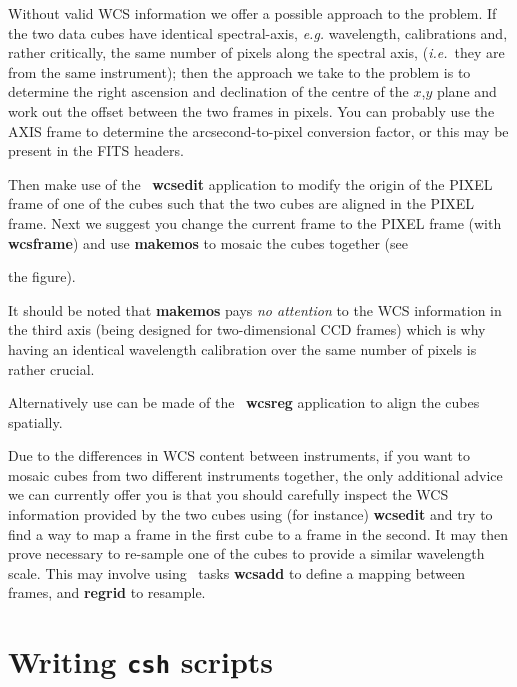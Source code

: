 \documentclass[twoside,11pt]{article}
\newcommand{\xref}[3]{#1}
\newcommand{\xlabel}[1]{}
\begin{document}
{Without valid WCS information we offer a possible approach to the
problem.  If the two data cubes have identical spectral-axis,
\emph{e.g.} wavelength, calibrations and, rather critically, the same
number of pixels along the spectral axis, (\emph{i.e.}\ they are from
the same instrument); then the approach we take to the problem is to
determine the right ascension and declination of the centre of the
$x$,$y$ plane and work out the offset between the two frames in
pixels.  You can probably use the AXIS frame to determine the
arcsecond-to-pixel conversion factor, or this may be present in the
FITS headers.

Then make use of the \CCDPACK\ \xref{{\bf wcsedit}}{sun139}{WCSEDIT}
application to modify the origin of the PIXEL frame of one of the
cubes such that the two cubes are aligned in the PIXEL frame.  Next
we suggest you change the current frame to the PIXEL frame (with 
\xref{{\bf wcsframe}}{sun95}{WCSFRAME}) and use
\xref{{\bf makemos}}{sun139}{MAKEMOS} to mosaic the cubes together (see
\begin{htmlonly}
the figure).
\end{htmlonly}
  It should be noted that {\bf makemos} pays
{\em no attention} to the WCS information in the third axis (being
designed for two-dimensional CCD frames) which is why having an
identical wavelength calibration over the same number of pixels is
rather crucial.

Alternatively use can be made of the \CCDPACK\ 
\xref{{\bf wcsreg}}{sun139}{WCSREG} application to align the cubes spatially.

Due to the differences in WCS content between instruments, if you want
to mosaic cubes from two different instruments together, the only
additional advice we can currently offer you is that you should
carefully inspect the WCS information provided by the two cubes using
(for instance) \xref{{\bf wcsedit}}{sun139}{WCSEDIT} and try to find a way
to map a frame in the first cube to a frame in the second.  It may
then prove necessary to re-sample one of the cubes to provide a
similar wavelength scale.  This may involve using \KAPPA\ tasks
\xref{{\bf wcsadd}}{sun95}{WCSADD} to define a mapping between frames,
and \xref{{\bf regrid}}{sun95}{REGRID} to resample.

\newpage
\section{\xlabel{sc16_writingcsh}Writing {\tt csh} scripts\label{sc16_writingcsh}}

}
\end{document}
